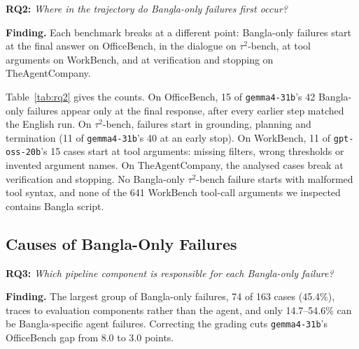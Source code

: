\documentclass[11pt]{article}
\newcommand{\gemma}{\texttt{gemma4-31b}}
\newcommand{\gptoss}{\texttt{gpt-oss-20b}}
\newcommand{\OB}{OfficeBench}
\newcommand{\WB}{WorkBench}
\newcommand{\TAU}{$\tau^2$-bench}
\newcommand{\TAC}{TheAgentCompany}
\begin{document}
\noindent\textbf{RQ2:} \emph{Where in the trajectory do Bangla-only failures first occur?}

\noindent\textbf{Finding.} Each benchmark breaks at a different point: Bangla-only failures start
at the final answer on \OB{}, in the dialogue on \TAU{}, at tool arguments on \WB{}, and at
verification and stopping on \TAC{}.


Table~\ref{tab:rq2} gives the counts. On \OB{}, 15 of \gemma{}'s 42 Bangla-only failures appear
only at the final response, after every earlier step matched the English run. On \TAU{}, failures
start in grounding, planning and termination (11 of \gemma{}'s 40 at an early stop). On \WB{}, 11 of \gptoss{}'s 15
cases start at tool arguments: missing filters, wrong thresholds or invented argument names.
On \TAC{}, the analysed cases break at verification and stopping. No Bangla-only \TAU{} failure
starts with malformed tool syntax, and none of the 641 \WB{} tool-call arguments we inspected
contains Bangla script.

\subsection{Causes of Bangla-Only Failures}
\label{sec:rq3}

\noindent\textbf{RQ3:} \emph{Which pipeline component is responsible for each Bangla-only failure?}

\noindent\textbf{Finding.} The largest group of Bangla-only failures, 74 of 163 cases (45.4\%),
traces to evaluation components rather than the agent, and only 14.7--54.6\% can be
Bangla-specific agent failures. Correcting the grading cuts \gemma{}'s \OB{} gap from 8.0 to 3.0
points.
\end{document}
